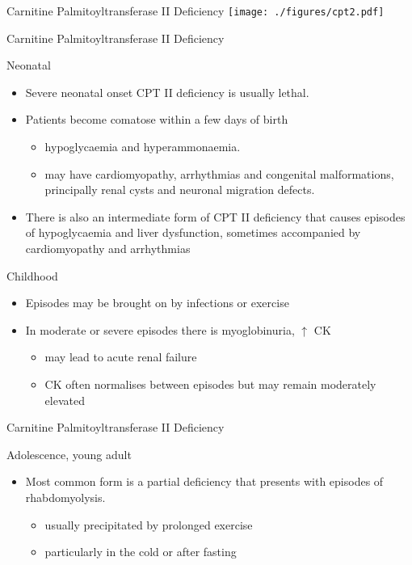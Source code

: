 \documentclass[presentation, smaller]{beamer}
\begin{document}
\begin{frame}[label={sec:orgheadline10}]{Carnitine Palmitoyltransferase II Deficiency}
\texttt{[image: ./figures/cpt2.pdf]}
\end{frame}
\begin{frame}[label={sec:orgheadline11}]{Carnitine Palmitoyltransferase II Deficiency}
\begin{block}{Neonatal}
\begin{itemize}
\item Severe neonatal onset CPT II deficiency is usually lethal.
\item Patients become comatose within a few days of birth
\begin{itemize}
\item hypoglycaemia and hyperammonaemia.
\item may have cardiomyopathy, arrhythmias and congenital malformations,
principally renal cysts and neuronal migration defects.
\end{itemize}
\item There is also an intermediate form of CPT II deficiency that causes
episodes of hypoglycaemia and liver dysfunction, sometimes
accompanied by cardiomyopathy and arrhythmias
\end{itemize}
\end{block}

\begin{block}{Childhood}
\begin{itemize}
\item Episodes may be brought on by infections or exercise
\item In moderate or severe episodes there is myoglobinuria, \(\uparrow\) CK
\begin{itemize}
\item may lead to acute renal failure
\item CK often normalises between episodes but may remain moderately
elevated
\end{itemize}
\end{itemize}
\end{block}
\end{frame}

\begin{frame}[label={sec:orgheadline12}]{Carnitine Palmitoyltransferase II Deficiency}
\begin{block}{Adolescence,  young adult}
\begin{itemize}
\item Most common form is a partial deficiency that presents with
episodes of rhabdomyolysis.
\begin{itemize}
\item usually precipitated by prolonged exercise
\item particularly in the cold or after fasting
\end{itemize}
\end{itemize}
\end{block}
\end{frame}
\end{document}
